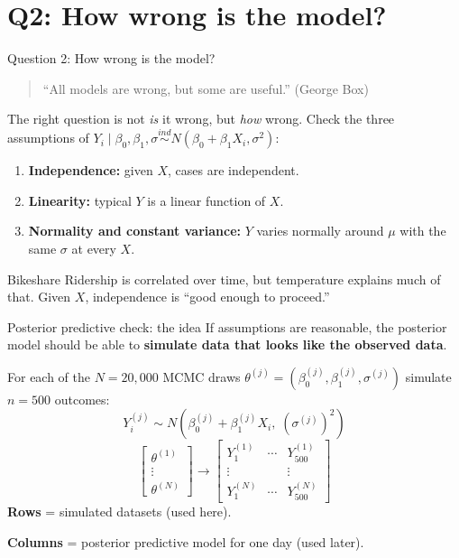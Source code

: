 \documentclass[aspectratio=43,11pt]{beamer}
\begin{document}
{
\section{Q2: How wrong is the model?}

\begin{frame}{Question 2: How wrong is the model?}
  \begin{quote}
    ``All models are wrong, but some are useful.'' (George Box)
  \end{quote}
  The right question is not \emph{is} it wrong, but \emph{how} wrong. Check the three assumptions of
  $Y_i\mid\beta_0,\beta_1,\sigma\overset{ind}{\sim}N(\beta_0+\beta_1X_i,\sigma^2)$:
  \begin{enumerate}
    \item \textbf{Independence:} given $X$, cases are independent.
    \item \textbf{Linearity:} typical $Y$ is a linear function of $X$.
    \item \textbf{Normality and constant variance:} $Y$ varies normally around $\mu$ with the same $\sigma$ at every $X$.
  \end{enumerate}
  \begin{block}{Bikeshare}
    Ridership is correlated over time, but temperature explains much of that. Given $X$, independence is ``good enough to proceed.''
  \end{block}
\end{frame}

\begin{frame}{Posterior predictive check: the idea}
  If assumptions are reasonable, the posterior model should be able to \textbf{simulate data that looks like the observed data}.

  \medskip
  For each of the $N=20{,}000$ MCMC draws $\theta^{(j)}=(\beta_0^{(j)},\beta_1^{(j)},\sigma^{(j)})$ simulate $n=500$ outcomes:
  \[
    Y_i^{(j)}\sim N\!\left(\beta_0^{(j)}+\beta_1^{(j)}X_i,\;(\sigma^{(j)})^2\right)
  \]
  \[
    \begin{bmatrix}\theta^{(1)}\\ \vdots\\ \theta^{(N)}\end{bmatrix}
    \longrightarrow
    \begin{bmatrix}
      Y_1^{(1)}&\cdots&Y_{500}^{(1)}\\
      \vdots&&\vdots\\
      Y_1^{(N)}&\cdots&Y_{500}^{(N)}
    \end{bmatrix}
  \]
  \textbf{Rows} = simulated datasets (used here).\par
  \textbf{Columns} = posterior predictive model for one day (used later).
\end{frame}

}
\end{document}
